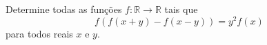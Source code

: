 Determine todas as funções $f \colon \mathbb{R} \to \mathbb{R}$ tais que
\[f(f(x+y)-f(x-y))=y^2f(x)\] para todos reais \(x\) e \(y\).
